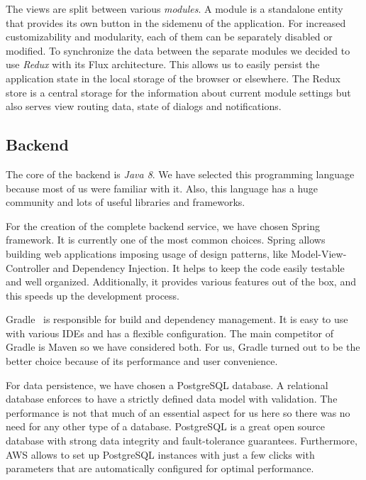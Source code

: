 \documentclass[licencjacka,en]{thesisclass}
\begin{document}
    The views are split between various \textit{modules}.
    A module is a standalone entity that provides its
    own button in the sidemenu of the application.
    For increased customizability and modularity, each of them
    can be separately disabled or modified.
    To synchronize the data between the separate modules we decided
    to use \textit{Redux} with its Flux architecture.
    This allows us to easily persist the application state
    in the local storage of the browser or elsewhere.
    The Redux store is a central storage for the information
    about current module settings but also serves view routing data,
    state of dialogs and notifications.

    \subsection{Backend}

    The core of the backend is \textit{Java 8}.
    We have selected this programming language because most of us were familiar with it.
    Also, this language has a huge community and lots of useful libraries and frameworks.

    For the creation of the complete backend service, we have chosen Spring~\cite{Spring} framework.
    It is currently one of the most common choices.
    Spring allows building web applications imposing usage
    of design patterns, like Model-View-Controller and Dependency Injection.
    It helps to keep the code easily testable and well organized.
    Additionally, it provides various features out of the box,
    and this speeds up the development process.

    Gradle~\cite{Gradle} is responsible for build and dependency management.
    It is easy to use with various IDEs and has a flexible configuration.
    The main competitor of Gradle is Maven so we have considered both.
    For us, Gradle turned out to be the better choice because
    of its performance and user convenience.

    For data persistence, we have chosen a PostgreSQL database.
    A relational database enforces to have a strictly defined data model with validation.
    The performance is not that much of an essential aspect for us here
    so there was no need for any other type of a database.
    PostgreSQL is a great open source database with strong data integrity
    and fault-tolerance guarantees.
    Furthermore, AWS allows to set up PostgreSQL instances with just a few clicks
    with parameters that are automatically configured for optimal performance.
\end{document}
